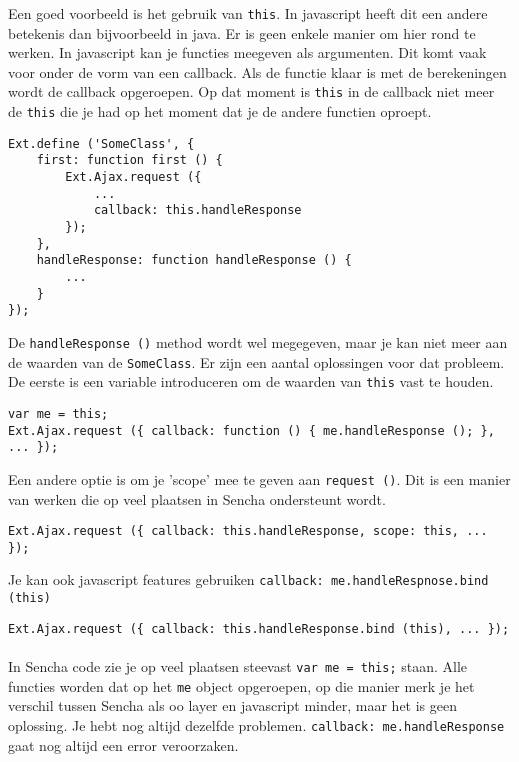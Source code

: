 Een goed voorbeeld is het gebruik van \lstinline{this}. In javascript heeft dit een andere
betekenis dan bijvoorbeeld in java. Er is geen enkele manier om hier rond te werken. In
javascript kan je functies meegeven als argumenten. Dit komt vaak voor onder de vorm van
een callback. Als de functie klaar is met de berekeningen wordt de callback opgeroepen. Op
dat moment is \lstinline{this} in de callback niet meer de \lstinline{this} die je had op
het moment dat je de andere functien oproept.

\begin{lstlisting}[language=ownjavascript]
Ext.define ('SomeClass', {
	first: function first () {
		Ext.Ajax.request ({
			...
			callback: this.handleResponse
		});
	},
	handleResponse: function handleResponse () {
		...
	}
});
\end{lstlisting}

De \lstinline{handleResponse ()} method wordt wel megegeven, maar je kan niet meer aan de
waarden van de \lstinline{SomeClass}. Er zijn een aantal oplossingen voor dat probleem. De
eerste is een variable introduceren om de waarden van \lstinline{this} vast te houden.

\begin{lstlisting}[language=ownjavascript]
var me = this;
Ext.Ajax.request ({ callback: function () { me.handleResponse (); }, ... });
\end{lstlisting}

Een andere optie is om je 'scope' mee te geven aan \lstinline{request ()}. Dit is een
manier van werken die op veel plaatsen in Sencha ondersteunt wordt.

\begin{lstlisting}[language=ownjavascript]
Ext.Ajax.request ({ callback: this.handleResponse, scope: this, ... });
\end{lstlisting}

Je kan ook javascript features gebruiken \lstinline{callback: me.handleRespnose.bind (this)}

\begin{lstlisting}[language=ownjavascript]
Ext.Ajax.request ({ callback: this.handleResponse.bind (this), ... });
\end{lstlisting}


\paragraph {} In Sencha code zie je op veel plaatsen steevast \lstinline{var me = this;}
staan. Alle functies worden dat op het \lstinline{me} object opgeroepen, op die manier
merk je het verschil tussen Sencha als oo layer en javascript minder, maar het is geen
oplossing. Je hebt nog altijd dezelfde problemen. \lstinline{callback: me.handleResponse}
gaat nog altijd een error veroorzaken.

